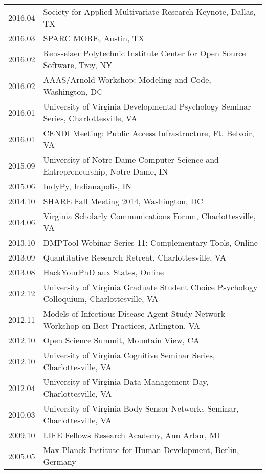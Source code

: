 \documentclass[11pt]{article}
\begin{document}
\begin{tabularx}{\textwidth}{lX}
    2016.04     & Society for Applied Multivariate Research Keynote, Dallas, TX\\
    2016.03     & SPARC MORE, Austin, TX\\
    2016.02     & Rensselaer Polytechnic Institute Center for Open Source Software, Troy, NY\\
    2016.02     & AAAS/Arnold Workshop: Modeling and Code, Washington, DC\\
    2016.01     & University of Virginia Developmental Psychology Seminar Series, Charlottesville, VA\\
    2016.01     & CENDI Meeting: Public Access Infrastructure, Ft. Belvoir, VA\\
    2015.09     & University of Notre Dame Computer Science and Entrepreneurship, Notre Dame, IN\\
    2015.06     & IndyPy, Indianapolis, IN\\
    2014.10     & SHARE Fall Meeting 2014, Washington, DC\\
    2014.06     & Virginia Scholarly Communications Forum, Charlottesville, VA\\
    2013.10     & DMPTool Webinar Series 11: Complementary Tools, Online\\
    2013.09     & Quantitative Research Retreat, Charlottesville, VA\\
    2013.08     & HackYourPhD aux States, Online\\
    2012.12     & University of Virginia Graduate Student Choice Psychology Colloquium, Charlottesville, VA\\
    2012.11     & Models of Infectious Disease Agent Study Network Workshop on Best Practices, Arlington, VA\\
    2012.10     & Open Science Summit, Mountain View, CA\\
    2012.10     & University of Virginia Cognitive Seminar Series, Charlottesville, VA\\
    2012.04     & University of Virginia Data Management Day, Charlottesville, VA\\
    2010.03     & University of Virginia Body Sensor Networks Seminar, Charlottesville, VA\\
    2009.10     & LIFE Fellows Research Academy, Ann Arbor, MI\\
    2005.05     & Max Planck Institute for Human Development, Berlin, Germany\\
\end{tabularx}
\end{document}
